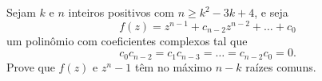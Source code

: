 Sejam \(k\) e \(n\) inteiros positivos com \(n\geq k^2-3k+4\), e seja
\[f(z)=z^{n-1}+c_{n-2}z^{n-2}+\dots+c_0\] um polinômio com coeficientes complexos tal que
\[c_0c_{n-2}=c_1c_{n-3}=\dots=c_{n-2}c_0=0.\] Prove que \(f(z)\) e \(z^n-1\) têm no máximo \(n-k\) raízes comuns.
